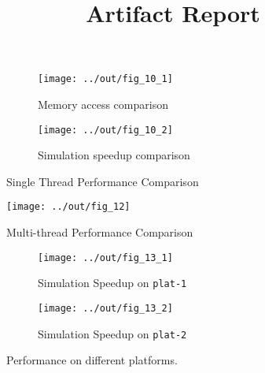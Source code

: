 \documentclass{sig-alternate}
\title{Artifact Report}
\begin{document}
\maketitle

\pagestyle{plain}

\begin{figure*}[t]
  \centering
  \begin{subfigure}{\linewidth}
    \centering
    \caption{Memory access comparison}
    \texttt{[image: ../out/fig\_10\_1]}
  \end{subfigure}
  \begin{subfigure}{\linewidth}
    \centering
    \caption{Simulation speedup comparison}
    \texttt{[image: ../out/fig\_10\_2]}
  \end{subfigure}
  \vspace*{-5mm}
  \caption{Single Thread Performance Comparison}
\end{figure*}

\begin{figure*}
  \centering
  \texttt{[image: ../out/fig\_12]}
  \vspace*{-5mm}
  \caption{Multi-thread Performance Comparison}
\end{figure*}

\begin{figure*}[t]
  \begin{subfigure}{\linewidth}
    \caption{Simulation Speedup on \texttt{plat-1}}
    \texttt{[image: ../out/fig\_13\_1]}
  \end{subfigure}
  \begin{subfigure}{\linewidth}
    \caption{Simulation Speedup on \texttt{plat-2}}
    \texttt{[image: ../out/fig\_13\_2]}
  \end{subfigure}
  \vspace*{-4mm}
  \caption{Performance on different platforms. }
\end{figure*}






\end{document}
